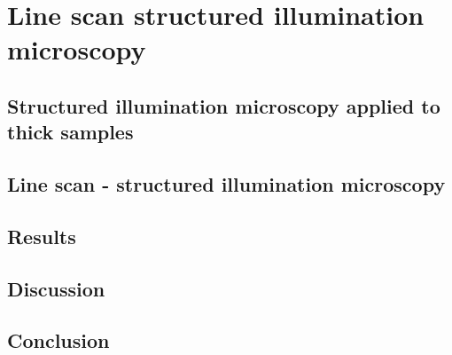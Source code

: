 \chapter{Line scan structured illumination microscopy}

\section{Structured illumination microscopy applied to thick samples}


\section{Line scan - structured illumination microscopy}


\section{Results}


\section{Discussion}


\section{Conclusion}